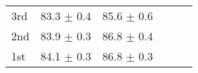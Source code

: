 \begin{center}
\begin{table*}
\begin{tabular*}{1\textwidth}{ l | c | c | c | c || c |}
\multicolumn{1}{|l|}{3rd}
& 83.3 $\pm$ 0.4
& 85.6 $\pm$ 0.6 
& & & \\ 

\multicolumn{1}{|l|}{2nd}
& 83.9 $\pm$ 0.3
& 86.8 $\pm$ 0.4 
& & & \\ 

\multicolumn{1}{|l|}{1st}
& 84.1 $\pm$ 0.3 
& 86.8 $\pm$ 0.3  
& & & \\ 

\cline{1-6}

\end{tabular*}

\label{tab:grand_performance_table}
\end{table*}

\end{center}

